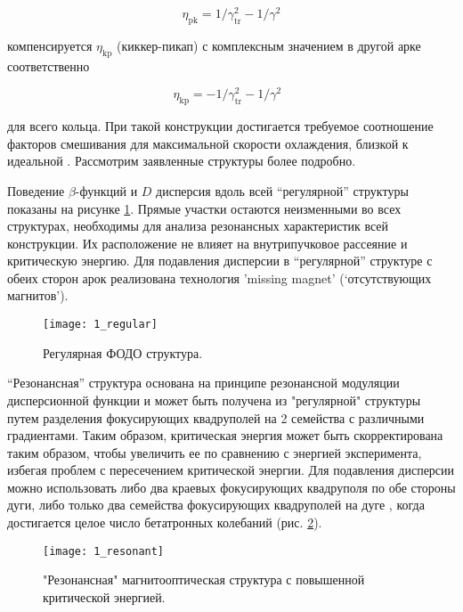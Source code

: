 \begin{equation} \label{eq:eta_pk}
\eta_{\textrm{pk}}=1/\gamma_{\textrm{tr}}^2-1/\gamma^2
\end{equation}

\noindent компенсируется $\eta_{\textrm{kp}}$ (киккер-пикап) с комплексным значением в другой арке соответственно

\begin{equation} \label{eq:eta_kp}
\eta_{\textrm{kp}}=-1/\gamma_{\textrm{tr}}^2-1/\gamma^2\ \ \ 
\end{equation}

\noindent для всего кольца. При такой конструкции достигается требуемое соотношение факторов смешивания для максимальной скорости охлаждения, близкой к идеальной \cite{senichev:hesr}. Рассмотрим заявленные структуры более подробно.

\par Поведение $\beta$-функций и $D$ дисперсия вдоль всей “регулярной” структуры показаны на рисунке \ref{fig:1_regular}. Прямые участки остаются неизменными во всех структурах, необходимы для анализа резонансных характеристик всей конструкции. Их расположение не влияет на внутрипучковое рассеяние и критическую энергию. Для подавления дисперсии в “регулярной” структуре с обеих сторон арок реализована технология 'missing magnet' (‘отсутствующих магнитов’).

\begin{figure}[!h]
  \centering
   \texttt{[image: 1\_regular]}
   \caption{Регулярная ФОДО структура.}
   \label{fig:1_regular}
\end{figure}

\noindent “Резонансная” структура основана на принципе резонансной модуляции дисперсионной функции \cite{senichev:construction} и может быть получена из "регулярной" структуры путем разделения фокусирующих квадруполей на 2 семейства с различными градиентами. Таким образом, критическая энергия может быть скорректирована таким образом, чтобы увеличить ее по сравнению с энергией эксперимента, избегая проблем с пересечением критической энергии. Для подавления дисперсии можно использовать либо два краевых фокусирующих квадруполя по обе стороны дуги, либо только два семейства фокусирующих квадруполей на дуге \cite{Kolokolchikov:2021trans}, когда достигается целое число бетатронных колебаний (рис. \ref{fig:1_resonant}).

\begin{figure}[!h]
  \centering
   \texttt{[image: 1\_resonant]}
   \caption{"Резонансная" магнитооптическая структура с повышенной критической энергией.}
   \label{fig:1_resonant}
\end{figure}

